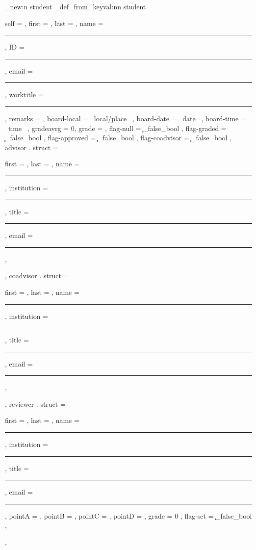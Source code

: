 \documentclass[10pt]{article}
\begin{document}
\begin{codestore}
\starray_new:n {student}
\starray_def_from_keyval:nn {student} {
  self = , %
  first = ,
  last = ,
  name = \rule{\l__stdemo_name_rule_dim}{.1pt} ,
  ID    = \rule{\l__stdemo_ID_rule_dim}{.1pt} , 
  email = \rule{\l__stdemo_email_rule_dim}{.1pt} ,
  worktitle = \rule{\l__stdemo_worktitle_rule_dim}{.1pt} ,
  remarks = ,
  board-local = {~local/place~} ,
  board-date   = {~date~} ,
  board-time  = {~time~} ,
  gradeavrg = 0,
  grade = ,
  flag-null = \c_false_bool , %
  flag-graded = \c_false_bool , %
  flag-approved = \c_false_bool ,
  flag-coadvisor = \c_false_bool ,
  advisor . struct = {
    first = ,
    last =  ,
    name = \rule{\l__stdemo_name_rule_dim}{.1pt},
    institution = \rule{\l__stdemo_name_rule_dim}{.1pt},
    title = \rule{\l__stdemo_title_rule_dim}{.1pt} ,
    email = \rule{\l__stdemo_email_rule_dim}{.1pt} ,
  } ,
  coadvisor . struct = {
    first = ,
    last =  ,
    name = \rule{\l__stdemo_name_rule_dim}{.1pt},
    institution = \rule{\l__stdemo_name_rule_dim}{.1pt},
    title = \rule{\l__stdemo_title_rule_dim}{.1pt} ,
    email = \rule{\l__stdemo_email_rule_dim}{.1pt} ,
  } ,
  reviewer . struct = {
    first = ,
    last =  ,
    name = \rule{\l__stdemo_name_rule_dim}{.1pt},
    institution = \rule{\l__stdemo_name_rule_dim}{.1pt},
    title = \rule{\l__stdemo_title_rule_dim}{.1pt} ,
    email = \rule{\l__stdemo_email_rule_dim}{.1pt} ,
    pointA = ,
    pointB = ,
    pointC = ,
    pointD = ,
    grade = 0 ,
    flag-set = \c_false_bool , 
  } ,
 }
\end{codestore}





\begin{codestore}[DataRecovery]

\end{codestore}
\end{document}
